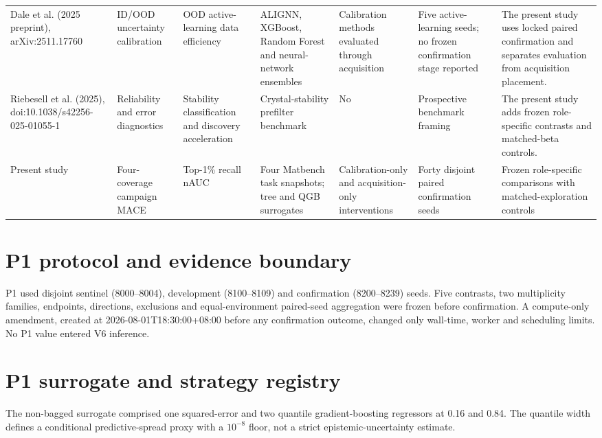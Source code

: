 \documentclass[10pt]{article}
\begin{document}
\begin{landscape}
\begin{longtable}{L{1.35in}L{1.45in}L{1.45in}L{1.45in}L{1.15in}L{1.1in}L{1.55in}}
Dale et al. (2025 preprint), arXiv:2511.17760 & ID/OOD uncertainty calibration & OOD active-learning data efficiency & ALIGNN, XGBoost, Random Forest and neural-network ensembles & Calibration methods evaluated through acquisition & Five active-learning seeds; no frozen confirmation stage reported & The present study uses locked paired confirmation and separates evaluation from acquisition placement.\\
Riebesell et al. (2025), doi:10.1038/s42256-025-01055-1 & Reliability and error diagnostics & Stability classification and discovery acceleration & Crystal-stability prefilter benchmark & No & Prospective benchmark framing & The present study adds frozen role-specific contrasts and matched-beta controls.\\
Present study & Four-coverage campaign MACE & Top-1\% recall nAUC & Four Matbench task snapshots; tree and QGB surrogates & Calibration-only and acquisition-only interventions & Forty disjoint paired confirmation seeds & Frozen role-specific comparisons with matched-exploration controls\\
\bottomrule
\end{longtable}
\endgroup
\end{landscape}

\section{P1 protocol and evidence boundary}\label{sec:supp-p1-protocol}
P1 used disjoint sentinel (8000--8004), development (8100--8109) and confirmation (8200--8239) seeds. Five contrasts, two multiplicity families, endpoints, directions, exclusions and equal-environment paired-seed aggregation were frozen before confirmation. A compute-only amendment, created at 2026-08-01T18:30:00+08:00 before any confirmation outcome, changed only wall-time, worker and scheduling limits. No P1 value entered V6 inference.

\section{P1 surrogate and strategy registry}\label{sec:supp-p1-strategies}
The non-bagged surrogate comprised one squared-error and two quantile gradient-boosting regressors at 0.16 and 0.84. The quantile width defines a conditional predictive-spread proxy with a $10^{-8}$ floor, not a strict epistemic-uncertainty estimate.
\end{document}
